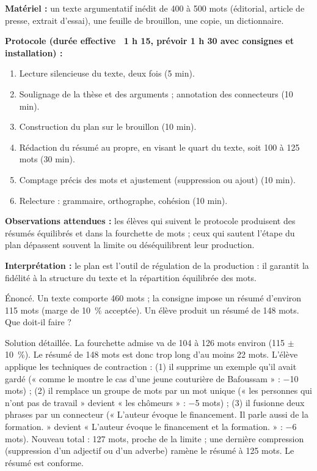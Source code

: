 \documentclass[11pt]{article}
\begin{document}
\begin{experience}
\textbf{Matériel :} un texte argumentatif inédit de 400 à 500 mots (éditorial, article de presse, extrait d'essai), une feuille de brouillon, une copie, un dictionnaire.

\textbf{Protocole (durée effective ~1 h 15, prévoir 1 h 30 avec consignes et installation) :}
\begin{enumerate}
\item Lecture silencieuse du texte, deux fois (5 min).
\item Soulignage de la thèse et des arguments ; annotation des connecteurs (10 min).
\item Construction du plan sur le brouillon (10 min).
\item Rédaction du résumé au propre, en visant le quart du texte, soit 100 à 125 mots (30 min).
\item Comptage précis des mots et ajustement (suppression ou ajout) (10 min).
\item Relecture : grammaire, orthographe, cohésion (10 min).
\end{enumerate}

\textbf{Observations attendues :} les élèves qui suivent le protocole produisent des résumés équilibrés et dans la fourchette de mots ; ceux qui sautent l'étape du plan dépassent souvent la limite ou déséquilibrent leur production.

\textbf{Interprétation :} le plan est l'outil de régulation de la production : il garantit la fidélité à la structure du texte et la répartition équilibrée des mots.
\end{experience}

\begin{exoresolu}
Énoncé. Un texte comporte 460 mots ; la consigne impose un résumé d'environ 115 mots (marge de 10~\% acceptée). Un élève produit un résumé de 148 mots. Que doit-il faire ?

\tcblower
Solution détaillée. La fourchette admise va de 104 à 126 mots environ (115 $\pm$ 10~\%). Le résumé de 148 mots est donc trop long d'au moins 22 mots. L'élève applique les techniques de contraction : (1) il supprime un exemple qu'il avait gardé (« comme le montre le cas d'une jeune couturière de Bafoussam » : $-$10 mots) ; (2) il remplace un groupe de mots par un mot unique (« les personnes qui n'ont pas de travail » devient « les chômeurs » : $-$5 mots) ; (3) il fusionne deux phrases par un connecteur (« L'auteur évoque le financement. Il parle aussi de la formation. » devient « L'auteur évoque le financement et la formation. » : $-$6 mots). Nouveau total : 127 mots, proche de la limite ; une dernière compression (suppression d'un adjectif ou d'un adverbe) ramène le résumé à 125 mots. Le résumé est conforme.
\end{exoresolu}
\end{document}
